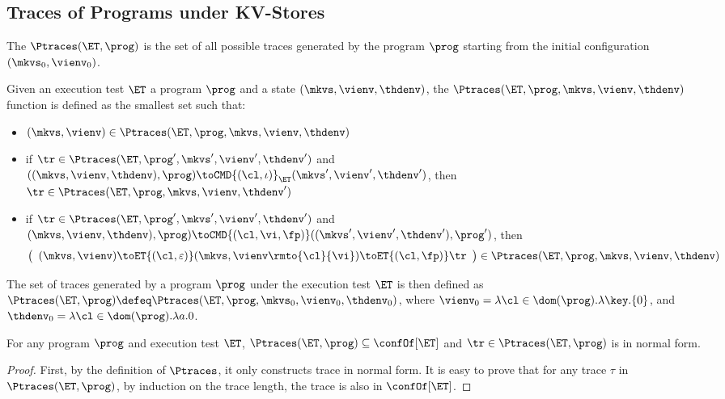 \subsection{Traces of Programs under KV-Stores}
\label{sec:kv-sound-complete-theorem}

The \( \Ptraces(\ET, \prog) \) is the set of all possible traces generated by the program \( \prog \)
starting from the initial configuration \( ( \mkvs_0, \vienv_0 ) \).

\begin{definition}
Given an execution test $\ET$ a program $\prog$ and a state 
$(\mkvs, \vienv, \thdenv)$, the  $\Ptraces(\ET, \prog, \mkvs, \vienv, \thdenv)$ function
is defined as the smallest set such that:
\begin{itemize}
\item $(\mkvs, \vienv) \in \Ptraces(\ET, \prog, \mkvs, \vienv, \thdenv)$
\item if $\tr \in \Ptraces(\ET, \prog', \mkvs', \vienv',\thdenv')$
and $((\mkvs, \vienv, \thdenv) , \prog) \toCMD{(\cl, \iota)}_{\ET} (\mkvs', \vienv', \thdenv')$, 
then $\tr \in \Ptraces(\ET, \prog, \mkvs, \vienv, \thdenv')$
\item if $\tr \in \Ptraces(\ET, \prog', \mkvs', \vienv', \thdenv')$ and 
$(\mkvs, \vienv, \thdenv), \prog) \toCMD{(\cl, \vi, \fp)} ((\mkvs', \vienv', \thdenv'), \prog')$,  
then 
\[
\left( 
\begin{array}{l}
(\mkvs, \vienv) \toET{(\cl, \varepsilon)}
(\mkvs, \vienv\rmto{\cl}{\vi}) \toET{(\cl, \fp)} \tr 
\end{array}
\right) \in \Ptraces(\ET, \prog, \mkvs, \vienv, \thdenv)
\]
\end{itemize}
The set of traces generated by a program $\prog$ under the execution test $\ET$ is 
then defined as $\Ptraces(\ET, \prog) \defeq \Ptraces(\ET, \prog, \mkvs_{0}, \vienv_{0}, \thdenv_{0})$, 
where $\vienv_{0} = \lambda \cl \in \dom(\prog).\lambda \key.\{0\}$, and 
$\thdenv_{0} = \lambda \cl \in \dom(\prog).\lambda a.0$.
\end{definition}


\begin{proposition}
\label{prop:program-trace-in-et-trace}
For any program $\prog$ and execution test $\ET$, 
$\Ptraces(\ET, \prog) \subseteq \confOf[\ET]$ and $\tr \in \Ptraces(\ET, \prog)$ is in normal form. 
\end{proposition}
\begin{proof}
    First, by the definition of \( \Ptraces \), 
    it only constructs trace in normal form.
    It is easy to prove that for any trace \( \tau \) in \( \Ptraces(\ET, \prog) \), by induction on the trace length,
    the trace is also in \( \confOf[\ET] \).
\end{proof}

